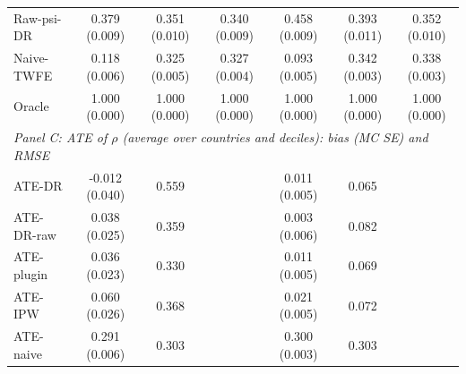\begin{tabular}{lcccccc}
Raw-psi-DR & 0.379 (0.009) & 0.351 (0.010) & 0.340 (0.009) & 0.458 (0.009) & 0.393 (0.011) & 0.352 (0.010) \\
Naive-TWFE & 0.118 (0.006) & 0.325 (0.005) & 0.327 (0.004) & 0.093 (0.005) & 0.342 (0.003) & 0.338 (0.003) \\
Oracle & 1.000 (0.000) & 1.000 (0.000) & 1.000 (0.000) & 1.000 (0.000) & 1.000 (0.000) & 1.000 (0.000) \\
\midrule
\multicolumn{7}{l}{\emph{Panel C: ATE of $\rho$ (average over countries and deciles): bias (MC SE) and RMSE}} \\
ATE-DR & -0.012 (0.040) & 0.559 &  & 0.011 (0.005) & 0.065 &  \\
ATE-DR-raw & 0.038 (0.025) & 0.359 &  & 0.003 (0.006) & 0.082 &  \\
ATE-plugin & 0.036 (0.023) & 0.330 &  & 0.011 (0.005) & 0.069 &  \\
ATE-IPW & 0.060 (0.026) & 0.368 &  & 0.021 (0.005) & 0.072 &  \\
ATE-naive & 0.291 (0.006) & 0.303 &  & 0.300 (0.003) & 0.303 &  \\
\bottomrule
\end{tabular}
